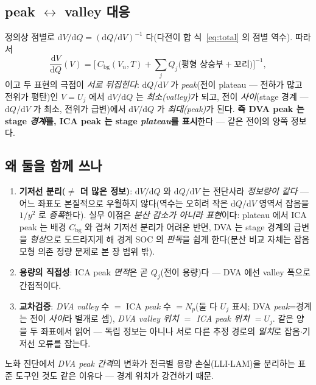\documentclass[11pt,a4paper]{article}
\newcommand{\dd}{\mathrm{d}}
\newcommand{\bg}{\mathrm{bg}}
\begin{document}
\subsection{peak $\leftrightarrow$ valley 대응}
정의상 점별로 $\dd V/\dd Q=(\dd Q/\dd V)^{-1}$ 다(다전이 합 식~\eqref{eq:total} 의 점별 역수). 따라서
\begin{equation}
\frac{\dd V}{\dd Q}(V)=\Big[\,C_\bg(V_n,T)+\sum_{j}Q_j\big(\text{평형 상승부}+\text{꼬리}\big)\Big]^{-1},
\label{eq:dva}
\end{equation}
이고 두 표현의 극점이 \emph{서로 뒤집힌다}: $\dd Q/\dd V$ 가 \emph{peak}(전이 plateau — 전하가 많고 전위가 평탄)인
$V=U_j$ 에서 $\dd V/\dd Q$ 는 \emph{최소(valley)}가 되고, 전이 \emph{사이}(stage 경계 — $\dd Q/\dd V$ 가 최소,
전위가 급변)에서 $\dd V/\dd Q$ 가 \emph{최대(peak)}가 된다. \textbf{즉 DVA peak 는 stage \emph{경계}를, ICA peak 는
stage \emph{plateau}를 표시}한다 — 같은 전이의 양쪽 정보다.

\subsection{왜 둘을 함께 쓰나}
\begin{enumerate}[label=(\roman*),leftmargin=2.0em,itemsep=2pt]
\item \textbf{기저선 분리($\ne$ 더 많은 정보)}: $\dd V/\dd Q$ 와 $\dd Q/\dd V$ 는 전단사라 \emph{정보량이 같다} —
  어느 좌표도 본질적으로 우월하지 않다(역수는 오히려 작은 $\dd Q/\dd V$ 영역서 잡음을 $1/y^2$ 로 \emph{증폭}한다).
  실무 이점은 \emph{분산 감소가 아니라 표현}이다: plateau 에서 ICA peak 는 배경 $C_\bg$ 와 겹쳐 기저선 분리가 어려운
  반면, DVA 는 stage 경계의 급변을 \emph{형상}으로 도드라지게 해 경계 SOC 의 \emph{판독}을 쉽게 한다(분산 비교 자체는
  잡음 모형 의존 정량 문제로 본 장 범위 밖).
\item \textbf{용량의 직접성}: ICA peak \emph{면적}은 곧 $Q_j$(전이 용량)다 — DVA 에선 valley 폭으로 간접적이다.
\item \textbf{교차검증}: \emph{DVA valley} 수 $=$ ICA \emph{peak} 수 $=N_p$(둘 다 $U_j$ 표시; DVA \emph{peak}=경계는 전이
  \emph{사이}라 별개로 셈), \emph{DVA valley 위치 $=$ ICA peak 위치 $=U_j$}. 같은 양을 두 좌표에서 읽어 — 독립 정보는
  아니나 서로 다른 추정 경로의 \emph{일치}로 잡음$\cdot$기저선 오류를 잡는다.
\end{enumerate}
노화 진단에서 \emph{DVA peak 간격}의 변화가 전극별 용량 손실(LLI$\cdot$LAM)을 분리하는 표준 도구인 것도 같은
이유다 \cite{dubarry2012,bloom2005} — 경계 위치가 강건하기 때문.
\end{document}
